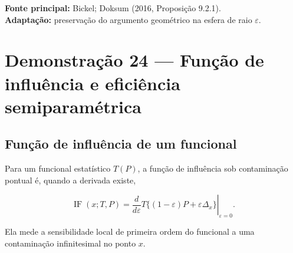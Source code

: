 \documentclass[
  letterpaper,
  DIV=11,
  numbers=noendperiod]{scrreprt}
\begin{document}
\begin{tcolorbox}[enhanced jigsaw, colback=white, leftrule=.75mm, colbacktitle=quarto-callout-note-color!10!white, breakable, titlerule=0mm, bottomtitle=1mm, title=\textcolor{quarto-callout-note-color}{\faInfo}\hspace{0.5em}{Fonte da demonstração}, colframe=quarto-callout-note-color-frame, toprule=.15mm, opacityback=0, bottomrule=.15mm, opacitybacktitle=0.6, arc=.35mm, toptitle=1mm, rightrule=.15mm, coltitle=black, left=2mm]

\textbf{Fonte principal:} Bickel; Doksum (2016, Proposição 9.2.1).\\
\textbf{Adaptação:} preservação do argumento geométrico na esfera de
raio \(\varepsilon\).

\end{tcolorbox}

\section*{Demonstração 24 --- Função de influência e eficiência
semiparamétrica}\label{demonstrauxe7uxe3o-24-funuxe7uxe3o-de-influuxeancia-e-eficiuxeancia-semiparamuxe9trica}


\subsection*{Função de influência de um
funcional}\label{funuxe7uxe3o-de-influuxeancia-de-um-funcional}

Para um funcional estatístico \(T(P)\), a função de influência sob
contaminação pontual é, quando a derivada existe,

\[
\operatorname{IF}(x;T,P)
=
\left.
\frac{d}{d\varepsilon}
T\{(1-\varepsilon)P+\varepsilon\Delta_x\}
\right|_{\varepsilon=0}.
\]

Ela mede a sensibilidade local de primeira ordem do funcional a uma
contaminação infinitesimal no ponto \(x\).
\end{document}
